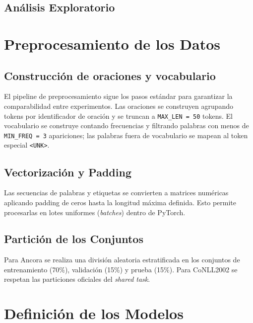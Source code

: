 \documentclass[12pt, a4paper]{article}
\begin{document}
\subsection{Análisis Exploratorio}
\section{Preprocesamiento de los Datos}

\subsection{Construcción de oraciones y vocabulario}

El pipeline de preprocesamiento sigue los pasos estándar para garantizar la
comparabilidad entre experimentos. Las oraciones se construyen agrupando tokens
por identificador de oración y se truncan a \texttt{MAX\_LEN = 50} tokens. El
vocabulario se construye contando frecuencias y filtrando palabras con menos de
\texttt{MIN\_FREQ = 3} apariciones; las palabras fuera de vocabulario se mapean al
token especial \texttt{<UNK>}.

\subsection{Vectorización y Padding}

Las secuencias de palabras y etiquetas se convierten a matrices numéricas
aplicando padding de ceros hasta la longitud máxima definida. Esto permite
procesarlas en lotes uniformes (\textit{batches}) dentro de PyTorch.


\subsection{Partición de los Conjuntos}

Para Ancora se realiza una división aleatoria estratificada en los conjuntos de
entrenamiento (70\%), validación (15\%) y prueba (15\%). Para CoNLL2002 se
respetan las particiones oficiales del \textit{shared task}.

\section{Definición de los Modelos}
\end{document}
